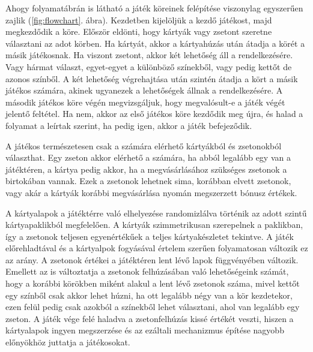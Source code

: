 Ahogy folyamatábrán is látható a játék köreinek felépítése viszonylag egyszerűen zajlik (\ref{fig:flowchart}. ábra). Kezdetben kijelöljük a kezdő játékost, majd megkezdődik a köre. Először eldönti, hogy kártyák vagy zsetont szeretne választani az adot körben. Ha kártyát, akkor a kártyahúzás után átadja a körét a másik játékosnak. Ha viszont zsetont, akkor két lehetőség áll a rendelkezésére. Vagy hármat választ, egyet-egyet a különböző színekből, vagy pedig kettőt de azonos színből. A két lehetőség végrehajtása után szintén átadja a kört a másik játékos számára, akinek ugyanezek a lehetőségek állnak a rendelkezésére. A második játékos köre végén megvizsgáljuk, hogy megvalósult-e a játék végét jelentő feltétel. Ha nem, akkor az első játékos köre kezdődik meg újra, és halad a folyamat a leírtak szerint, ha pedig igen, akkor a játék befejeződik.


A játékos természetesen csak a számára elérhető kártyákból és zsetonokból választhat. Egy zseton akkor elérhető a számára, ha abból legalább egy van a játéktéren, a kártya pedig akkor, ha a megvásárlásához szükséges zsetonok a birtokában vannak. Ezek a zsetonok lehetnek sima, korábban elvett zsetonok, vagy akár a kártyák korábbi megvásárlása nyomán megszerzett bónusz értékek.


A kártyalapok a játéktérre való elhelyezése randomizlálva történik az adott szintű kártyapaklikból megfelelően. A kártyák szimmetrikusan szerepelnek a paklikban, így a zsetonok teljesen egyenértékűek a teljes kártyakészletet tekintve. A játék előrehladtával és a kártyalpok fogyásával értelem szerűen folyamatosan változik ez az arány. A zsetonok értékei a játéktéren lent lévő lapok függvényében változik. Emellett az is változtatja a zsetonok felhúzásában való lehetőségeink számát, hogy a korábbi körökben miként alakul a lent lévő zsetonok száma, mivel kettőt egy színből csak akkor lehet húzni, ha ott legalább négy van a kör kezdetekor, ezen felül pedig csak azokból a színekből lehet választani, ahol van legalább egy zseton. A játék vége felé haladva a zsetonfelhúzás kissé értékét veszti, hiszen a kártyalapok ingyen megszerzése és az ezáltali mechanizmus építése nagyobb előnyökhöz juttatja a játékosokat.
